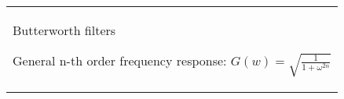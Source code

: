 \begin{tabular}{@{}L@{}}
Butterworth filters 

General n-th order frequency response: 
$G(w) = \sqrt{\frac{1}{1 + \omega^{2n}}}$
\end{tabular}

